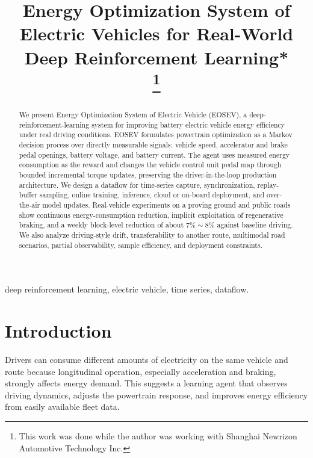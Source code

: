 \documentclass[conference]{IEEEtran}
\title{Energy Optimization System of Electric Vehicles for Real-World Deep Reinforcement Learning*\\
\thanks{This work was done while the author was working with Shanghai Newrizon Automotive Technology Inc.}
}
\begin{document}
\author{
}


\maketitle

\begin{abstract}
We present Energy Optimization System of Electric Vehicle (EOSEV), a deep-reinforcement-learning system for improving battery electric vehicle energy efficiency under real driving conditions. EOSEV formulates powertrain optimization as a Markov decision process over directly measurable signals: vehicle speed, accelerator and brake pedal openings, battery voltage, and battery current. The agent uses measured energy consumption as the reward and changes the vehicle control unit pedal map through bounded incremental torque updates, preserving the driver-in-the-loop production architecture. We design a dataflow for time-series capture, synchronization, replay-buffer sampling, online training, inference, cloud or on-board deployment, and over-the-air model updates. Real-vehicle experiments on a proving ground and public roads show continuous energy-consumption reduction, implicit exploitation of regenerative braking, and a weekly block-level reduction of about $7\%\sim8\%$ against baseline driving. We also analyze driving-style drift, transferability to another route, multimodal road scenarios, partial observability, sample efficiency, and deployment constraints.
\end{abstract}

\begin{IEEEkeywords}
deep reinforcement learning, electric vehicle, time series, dataflow.
\end{IEEEkeywords}

\section{Introduction}

Drivers can consume different amounts of electricity on the same vehicle and route because longitudinal operation, especially acceleration and braking, strongly affects energy demand. This suggests a learning agent that observes driving dynamics, adjusts the powertrain response, and improves energy efficiency from easily available fleet data.
\end{document}
